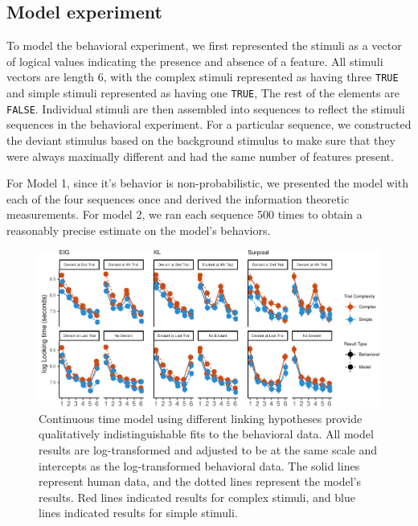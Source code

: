 \documentclass[10pt, letterpaper]{article}
\newenvironment{CodeChunk}{}{}
\begin{document}
\hypertarget{model-experiment}{%
\subsection{Model experiment}\label{model-experiment}}

To model the behavioral experiment, we first represented the stimuli as
a vector of logical values indicating the presence and absence of a
feature. All stimuli vectors are length 6, with the complex stimuli
represented as having three \texttt{TRUE} and simple stimuli represented
as having one \texttt{TRUE}, The rest of the elements are
\texttt{FALSE}. Individual stimuli are then assembled into sequences to
reflect the stimuli sequences in the behavioral experiment. For a
particular sequence, we constructed the deviant stimulus based on the
background stimulus to make sure that they were always maximally
different and had the same number of features present.

For Model 1, since it's behavior is non-probabilistic, we presented the
model with each of the four sequences once and derived the information
theoretic measurements. For model 2, we ran each sequence 500 times to
obtain a reasonably precise estimate on the model's behaviors.

\begin{CodeChunk}
\begin{figure}[h!]

{\centering \includegraphics{figs/experiment_res-1} 

}

\caption[Continuous time model using different linking hypotheses provide qualitatively indistinguishable fits to the behavioral data]{Continuous time model using different linking hypotheses provide qualitatively indistinguishable fits to the behavioral data. All model results are log-transformed and adjusted to be at the same scale and intercepts as the log-transformed behavioral data. The solid lines represent human data, and the dotted lines represent the model's results. Red lines indicated results for complex stimuli, and blue lines indicated results for simple stimuli.}\label{fig:experiment_res}
\end{figure}
\end{CodeChunk}
\end{document}
